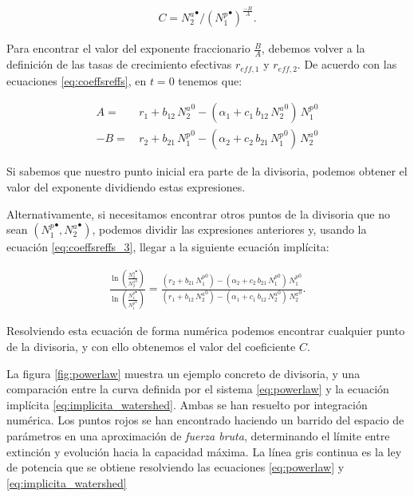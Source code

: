 \begin{align}
C = {N_2^a}^\bullet / ({N_1^p}^\bullet)^\frac{-B}{A} .
\end{align}

Para encontrar el valor del exponente fraccionario $\frac{B}{A}$, debemos volver a la definición de las tasas de crecimiento efectivas $r_{eff,1}$ y $r_{eff,2}$. De acuerdo con las ecuaciones \eqref{eq:coeffsreffs}, en $t=0$ tenemos que:
 
\begin{align}
A = & \, r_{1}+ b_{12}\, {N_2^a}^0 - (\alpha_{1}+ c_{1} \, b_{12}\, {N_{2}^a}^0) \, {N_1^p}^0  \nonumber\\
-B = &\, r_{2} + b_{21} \, {N_{1}^p}^0-(\alpha_{2}+ c_{2}\,  b_{21}\, {N_{1}^p}^0)\,  {N_{2}^a}^0 
\label{eq:reffs_2especies}
\end{align}

Si sabemos que nuestro punto inicial era parte de la divisoria, podemos obtener el valor del exponente dividiendo estas expresiones.

Alternativamente, si necesitamos encontrar otros puntos de la divisoria que no sean $({N_1^p}^\bullet,{N_2^a}^\bullet)$, podemos dividir las expresiones anteriores y, usando la ecuación \ref{eq:coeffsreffs_3}, llegar a la siguiente ecuación implícita:

\begin{align}
\frac {\ln \left( \frac{{N_2^a}^\bullet}{{N_2^a}^0} \right)}{\ln \left( \frac{{N_1^p}^\bullet}{{N_1^p}^0} \right)} = \frac{( r_{2}+ b_{21}\, {N_1^p}^0) - (\alpha_{2}+ c_{2} \,  b_{21}\, {N_1^p}^0 ) \, {N_1^p}^0}{( r_{1}+ b_{12}\, {N_2^a}^0) - (\alpha_{1}+ c_{1} \, b_{12}\, {N_2^a}^0 ) \, {N_2^a}^0 } .
\label{eq:implicita_watershed}
\end{align}

Resolviendo esta ecuación de forma numérica podemos encontrar cualquier punto de la divisoria, y con ello obtenemos el valor del coeficiente $C$. 

La figura \ref{fig:powerlaw} muestra un ejemplo concreto de divisoria, y una comparación entre la curva definida por el sistema \ref{eq:powerlaw} y la ecuación implícita \ref{eq:implicita_watershed}. Ambas se han resuelto por integración numérica. Los puntos rojos se han encontrado haciendo un barrido del espacio de parámetros en una aproximación de \textit{fuerza bruta}, determinando el límite entre extinción y evolución hacia la capacidad máxima. La línea gris continua es la ley de potencia que se obtiene resolviendo las ecuaciones \ref{eq:powerlaw} y \ref{eq:implicita_watershed}

